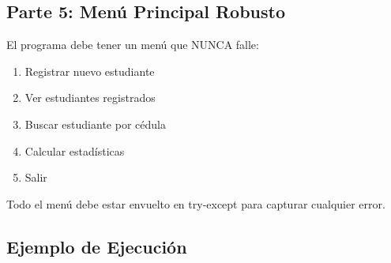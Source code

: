 \documentclass[12pt,a4paper]{article}
\begin{document}
\subsection{Parte 5: Menú Principal Robusto}

El programa debe tener un menú que NUNCA falle:

\begin{enumerate}[leftmargin=*]
    \item Registrar nuevo estudiante
    \item Ver estudiantes registrados
    \item Buscar estudiante por cédula
    \item Calcular estadísticas
    \item Salir
\end{enumerate}

Todo el menú debe estar envuelto en try-except para capturar cualquier error.

\newpage

\subsection{Ejemplo de Ejecución}
\end{document}
